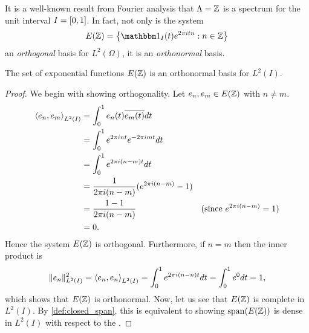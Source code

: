 \documentclass[../thesis.tex]{subfiles}
\begin{document}
It is a well-known result from Fourier analysis that $\Lambda = \mathbb{Z}$ is a spectrum for the unit interval $I=[0,1]$. In fact, not only is the system
\begin{equation*}
    E(\Z) = \braqMed{\indicator{I}{t} e^{2\pi i t n} : n \in \Z}
\end{equation*} 
an \emph{orthogonal} basis for $L^2(\Omega)$, it is an \emph{orthonormal} basis.
\begin{theorem}\label{lem:exp_onb_onedim}
    The set of exponential functions $E(\mathbb{Z})$ is an orthonormal basis for $L^2(I)$.
\end{theorem}
\begin{proof}
    We begin with showing orthogonality. Let $e_{n}, e_{m} \in E(\mathbb{Z})$ with $n \neq m$. %
    \begin{align}\label{eq:orthog_one_dim_req}
        \left \langle e_{n},e_{m}  \right \rangle_{L^2(I)} &= \int_0^1 e_{n}(t)\overline{e_{m}(t)} dt \nonumber\\ 
        &= \int_0^1 e^{2 \pi i {n}t} e^{-2 \pi i {m}t} dt \nonumber\\
        &= \int_0^1 e^{2 \pi i (n-m)t} dt \nonumber\\
        &=\frac{1}{2 \pi i (n-m)} (e^{2 \pi i (n - m)} -1) \\
        &=\frac{1-1}{2 \pi i (n-m)} & (\text{since } e^{2 \pi i (n-m)} = 1) \nonumber\\
        &= 0 \nonumber.
    \end{align}
    Hence the system $E(\mathbb{Z})$ is orthogonal. Furthermore, if $n =m$ then the inner product is
    \begin{align*}\label{eq:exp_norm_one}
        \| e_n \|^2_{L^2(I)} 
        = \left \langle e_{n},e_{n}  \right \rangle_{L^2(I)} 
        = \int_0^1 e^{2 \pi i (n-n)t} dt
        = \int_0^1 e^{0} dt = 1,
    \end{align*}
    which shows that $E(\mathbb{Z})$ is orthonormal. Now, let us see that $E(\mathbb{Z})$ is complete in $L^2(I)$. By \cref{def:closed_span}, this is equivalent to showing $\operatorname{span}(E(\mathbb{Z}))$ is dense in $L^2(I)$ with respect to the \Ltwonorm. 

\end{proof}
\end{document}
